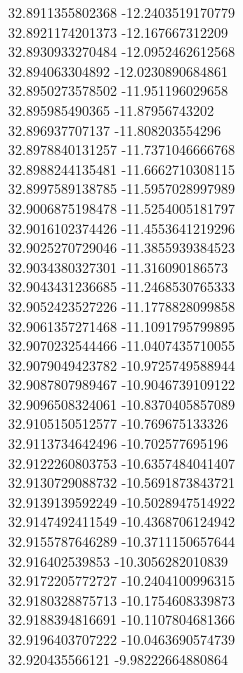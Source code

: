 {32.8911355802368	-12.2403519170779\\
32.8921174201373	-12.167667312209\\
32.8930933270484	-12.0952462612568\\
32.894063304892	-12.0230890684861\\
32.8950273578502	-11.951196029658\\
32.895985490365	-11.87956743202\\
32.896937707137	-11.808203554296\\
32.8978840131257	-11.7371046666768\\
32.8988244135481	-11.6662710308115\\
32.8997589138785	-11.5957028997989\\
32.9006875198478	-11.5254005181797\\
32.9016102374426	-11.4553641219296\\
32.9025270729046	-11.3855939384523\\
32.9034380327301	-11.316090186573\\
32.9043431236685	-11.2468530765333\\
32.9052423527226	-11.1778828099858\\
32.9061357271468	-11.1091795799895\\
32.9070232544466	-11.0407435710055\\
32.9079049423782	-10.9725749588944\\
32.9087807989467	-10.9046739109122\\
32.9096508324061	-10.8370405857089\\
32.9105150512577	-10.769675133326\\
32.9113734642496	-10.702577695196\\
32.9122260803753	-10.6357484041407\\
32.9130729088732	-10.5691873843721\\
32.9139139592249	-10.5028947514922\\
32.9147492411549	-10.4368706124942\\
32.9155787646289	-10.3711150657644\\
32.916402539853	-10.3056282010839\\
32.9172205772727	-10.2404100996315\\
32.9180328875713	-10.1754608339873\\
32.9188394816691	-10.1107804681366\\
32.9196403707222	-10.0463690574739\\
32.920435566121	-9.98222664880864\\
}
